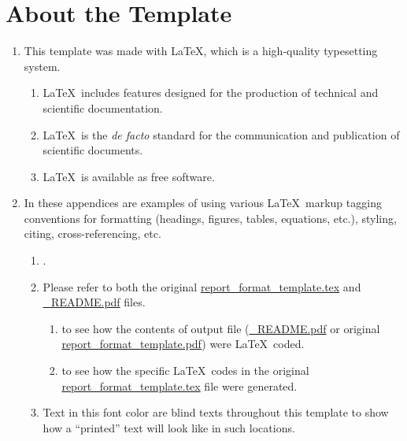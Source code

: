\section{About the Template}

\begin{enumerate}
	\item This template was made with \LaTeX, which is a high-quality typesetting system. 
		
	\begin{enumerate}
		\item \LaTeX\ includes features designed for the production of technical and scientific documentation. 
	
		\item \LaTeX\ is the \textit{de facto} standard for the communication and publication of scientific documents. 
		
		\item \LaTeX\ is available as free software. 
	\end{enumerate}
			
	\item In these appendices are examples of using various \LaTeX\ markup tagging conventions for formatting (headings, figures, tables, equations, etc.), styling, citing, cross-referencing, etc.
		
	\begin{enumerate}
		\item  \emph{}. 
		
		\item Please refer to both the original \url{report_format_template.tex} and \url{_README.pdf} files. 
		
		\begin{enumerate}
			\item {} to see how the contents of output file (\url{_README.pdf} or original \url{report_format_template.pdf}) were \LaTeX\ coded.
			
			\item {} to see how the specific \LaTeX\ codes in the original \url{report_format_template.tex} file were generated.
		\end{enumerate}
						
		\item Text in this \textcolor[rgb]{1,1,0}{font color} are blind texts throughout this template to show how a ``printed'' text will look like in such locations.
	\end{enumerate}
	

\end{enumerate}
